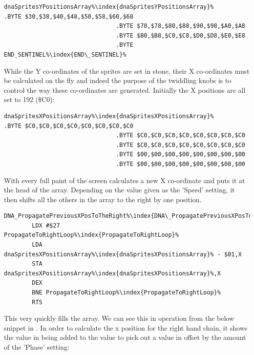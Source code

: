 \begin{lstlisting}[escapechar=\%]
dnaSpritesYPositionsArray%\index{dnaSpritesYPositionsArray}%       .BYTE $30,$38,$40,$48,$50,$58,$60,$68
                                .BYTE $70,$78,$80,$88,$90,$98,$A0,$A8
                                .BYTE $B0,$B8,$C0,$C8,$D0,$D8,$E0,$E8
                                .BYTE END_SENTINEL%\index{END\_SENTINEL}%
\end{lstlisting}

While the Y co-ordinates of the sprites are set in stone, their X co-ordinates must be calculated on the fly
and indeed the purpose of the twiddling knobs is to control the way these co-ordinates are generated. Initially
the X positions are all set to 192 (\$C0):

\begin{lstlisting}[escapechar=\%]
dnaSpritesXPositionsArray%\index{dnaSpritesXPositionsArray}%       .BYTE $C0,$C0,$C0,$C0,$C0,$C0,$C0,$C0
                                .BYTE $C0,$C0,$C0,$C0,$C0,$C0,$C0,$C0
                                .BYTE $C0,$C0,$C0,$C0,$C0,$C0,$C0,$C0
                                .BYTE $00,$00,$00,$00,$00,$00,$00,$00
                                .BYTE $00,$00,$00,$00,$00,$00,$00,$00
\end{lstlisting}

With every full paint of the screen calculates a new X co-ordinate and puts it at the head of the array. Depending
on the value given as the 'Speed' setting, it then shifts all the others in the array to the right by one position. 

\begin{lstlisting}[escapechar=\%]
DNA_PropagatePreviousXPosToTheRight%\index{DNA\_PropagatePreviousXPosToTheRight}%
        LDX #$27
PropagateToRightLoop%\index{PropagateToRightLoop}%   
        LDA dnaSpritesXPositionsArray%\index{dnaSpritesXPositionsArray}% - $01,X
        STA dnaSpritesXPositionsArray%\index{dnaSpritesXPositionsArray}%,X
        DEX
        BNE PropagateToRightLoop%\index{PropagateToRightLoop}%
        RTS
\end{lstlisting}

This very quickly fills the array.  We can see this in operation from the below
snippet in . In order to calculate the x position
for the right hand chain, it shows the value in
 being added to the value
 to pick out a value in
 offset by the amount of the 'Phase' setting:

